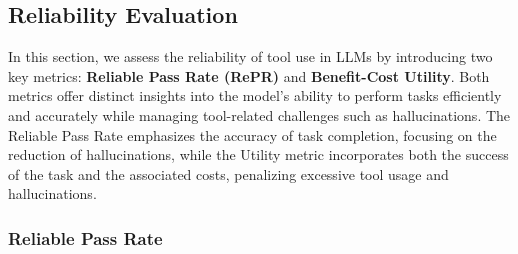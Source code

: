 \subsection{Reliability Evaluation}





In this section, we assess the reliability of tool use in LLMs by introducing two key metrics: \textbf{Reliable Pass Rate (RePR)} and \textbf{Benefit-Cost Utility}. Both metrics offer distinct insights into the model's ability to perform tasks efficiently and accurately while managing tool-related challenges such as hallucinations. The Reliable Pass Rate emphasizes the accuracy of task completion, focusing on the reduction of hallucinations, while the Utility metric incorporates both the success of the task and the associated costs, penalizing excessive tool usage and hallucinations.

\subsubsection{Reliable Pass Rate}

